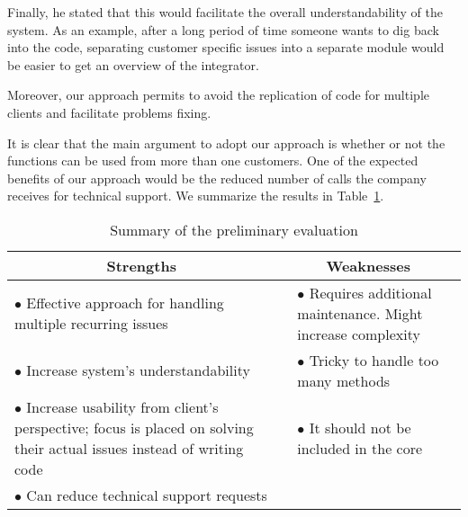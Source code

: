 Finally, he stated that this would facilitate the overall understandability of the system. As an example, after a long period of time someone wants to dig back into the code, separating customer specific issues into a separate module would be easier to get an overview of the integrator.

Moreover, our approach permits to avoid the replication of code for multiple clients and facilitate problems fixing. 


It is clear that the main argument to adopt our approach is whether or not the functions can be used from more than one customers. %
One of the expected benefits of our approach would be the reduced number of calls the company receives for technical support. 
We summarize the results in Table~\ref{tab:preliminaryResults}. 

\begin{table}[h]
\centering
{\small \begin{tabular}{p{4.3cm} l p{2.5cm}}
\hline
\multicolumn{1}{c}{{\bf Strengths}} & \multicolumn{2}{c}{{\bf Weaknesses} } \\
[1ex]
\hline
$\bullet$ Effective approach for handling multiple recurring issues  &  & $\bullet$ Requires additional maintenance. Might increase complexity \\
[1ex]
\hline
$\bullet$ Increase system's understandability    &  & $\bullet$ Tricky to handle too many methods   \\
[1ex]
\hline
$\bullet$ Increase usability from client's perspective; focus is placed on solving their actual issues instead of writing code  &  & $\bullet$ It should not be included in the core   \\
[3ex]
\hline
$\bullet$ Can reduce technical support requests     &  &          \\
\hline
\end{tabular}}
\caption{Summary of the preliminary evaluation}\label{tlc}
\label{tab:preliminaryResults}
\end{table}


